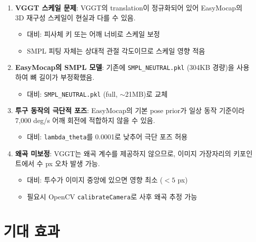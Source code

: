 \documentclass[11pt, a4paper]{report}
\begin{document}
\begin{enumerate}[leftmargin=*]
  \item \textbf{VGGT 스케일 문제}: VGGT의 translation이 정규화되어 있어 EasyMocap의 3D 재구성 스케일이 현실과 다를 수 있음.
    \begin{itemize}
      \item 대비: 피사체 키 또는 어깨 너비로 스케일 보정
      \item SMPL 피팅 자체는 상대적 관절 각도이므로 스케일 영향 적음
    \end{itemize}

  \item \textbf{EasyMocap의 SMPL 모델}: 기존에 \texttt{SMPL\_NEUTRAL.pkl} (304KB 경량)을 사용하여 뼈 길이가 부정확했음.
    \begin{itemize}
      \item 대비: \texttt{SMPL\_NEUTRAL.pkl} (full, $\sim$21MB)로 교체
    \end{itemize}

  \item \textbf{투구 동작의 극단적 포즈}: EasyMocap의 기본 pose prior가 일상 동작 기준이라 7,000 deg/s 어깨 회전에 적합하지 않을 수 있음.
    \begin{itemize}
      \item 대비: \texttt{lambda\_theta}를 0.0001로 낮추어 극단 포즈 허용
    \end{itemize}

  \item \textbf{왜곡 미보정}: VGGT는 왜곡 계수를 제공하지 않으므로, 이미지 가장자리의 키포인트에서 수 px 오차 발생 가능.
    \begin{itemize}
      \item 대비: 투수가 이미지 중앙에 있으면 영향 최소 ($< 5$ px)
      \item 필요시 OpenCV \texttt{calibrateCamera}로 사후 왜곡 추정 가능
    \end{itemize}
\end{enumerate}


\chapter{기대 효과}
\end{document}
